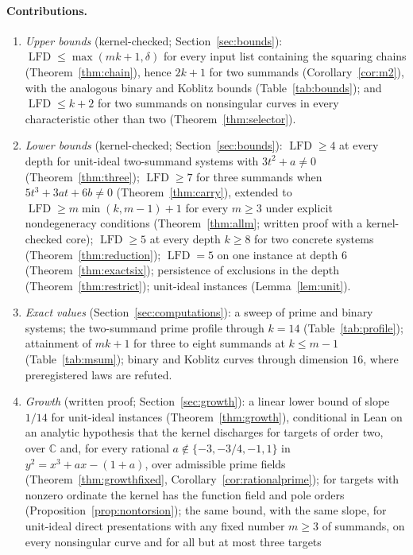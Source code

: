 \documentclass[11pt]{article}
\theoremstyle{definition}\newtheorem{definition}[theorem]{Definition}
\theoremstyle{remark}\newtheorem{remark}[theorem]{Remark}
\newcommand{\lfd}{\operatorname{LFD}}
\begin{document}
\paragraph{Contributions.}
\begin{enumerate}
\item \emph{Upper bounds} (kernel-checked; Section~\ref{sec:bounds}):
 $\lfd\le\max(mk+1,\delta)$ for every input list containing the squaring
 chains (Theorem~\ref{thm:chain}), hence $2k+1$ for two summands
 (Corollary~\ref{cor:m2}), with the analogous binary and Koblitz bounds
 (Table~\ref{tab:bounds}); and $\lfd\le k+2$ for two summands on
 nonsingular curves in every characteristic other than two
 (Theorem~\ref{thm:selector}).
\item \emph{Lower bounds} (kernel-checked; Section~\ref{sec:bounds}):
 $\lfd\ge4$ at every depth for unit-ideal two-summand systems with
 $3t^2+a\ne0$ (Theorem~\ref{thm:three}); $\lfd\ge7$ for three summands when
 $5t^3+3at+6b\ne0$ (Theorem~\ref{thm:carry}), extended to
 $\lfd\ge m\min(k,m-1)+1$ for every $m\ge3$ under explicit nondegeneracy
 conditions (Theorem~\ref{thm:allm}; written proof with a kernel-checked
 core); $\lfd\ge5$ at every depth
 $k\ge8$ for two concrete systems (Theorem~\ref{thm:reduction}); $\lfd=5$ on
 one instance at depth $6$ (Theorem~\ref{thm:exactsix}); persistence of
 exclusions in the depth (Theorem~\ref{thm:restrict}); unit-ideal
 instances (Lemma~\ref{lem:unit}).
\item \emph{Exact values} (Section~\ref{sec:computations}): a sweep of
 \SWEEPSYSTEMS{} prime and binary systems; the two-summand prime profile
 through $k=14$ (Table~\ref{tab:profile}); attainment of $mk+1$ for three
 to eight summands at $k\le m-1$ (Table~\ref{tab:msum}); binary and Koblitz
 curves through dimension $16$, where preregistered laws are refuted.
\item \emph{Growth} (written proof; Section~\ref{sec:growth}): a linear
 lower bound of slope $1/14$ for unit-ideal instances
 (Theorem~\ref{thm:growth}), conditional in Lean on an analytic hypothesis
 that the kernel discharges for targets of order two, over $\mathbb{C}$ and,
 for every rational $a\notin\{-3,-3/4,-1,1\}$ in $y^2=x^3+ax-(1+a)$, over
 admissible prime fields (Theorem~\ref{thm:growthfixed},
 Corollary~\ref{cor:rationalprime}); for targets with nonzero ordinate the
 kernel has the function field and pole orders
 (Proposition~\ref{prop:nontorsion}); the same bound, with the same slope,
 for unit-ideal direct presentations with any fixed number $m\ge3$ of
 summands, on every nonsingular curve and for all but at most three targets

\end{enumerate}
\end{document}

